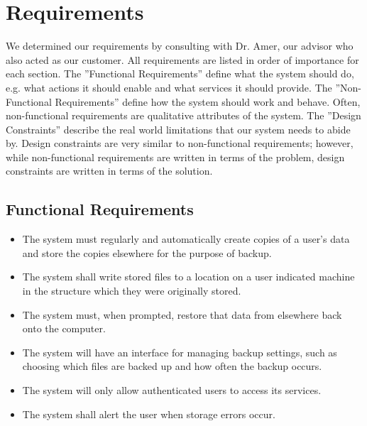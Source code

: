 \chapter {Requirements}

We determined our requirements by consulting with Dr. Amer, our advisor who also acted as our customer.  All requirements are listed in order of importance for each section.  The ''Functional Requirements'' define what the system should do, e.g. what actions it should enable and what services it should provide.  The ''Non-Functional Requirements'' define how the system should work and behave.  Often, non-functional requirements are qualitative attributes of the system.  The ''Design Constraints'' describe the real world limitations that our system needs to abide by.  Design constraints are very similar to non-functional requirements; however, while non-functional requirements are written in terms of the problem, design constraints are written in terms of the solution.

\section {Functional Requirements}

	\begin{itemize}
		\item The system must regularly and automatically create copies of a user's data and store the copies elsewhere for the purpose of backup.

		\item The system shall write stored files to a location on a user indicated machine in the structure which they were originally stored.

		\item The system must, when prompted, restore that data from elsewhere back onto the computer.

		\item The system will have an interface for managing backup settings, such as choosing which files are backed up and how often the backup occurs.

		\item The system will only allow authenticated users to access its services.

		\item The system shall alert the user when storage errors occur.

	\end{itemize}

